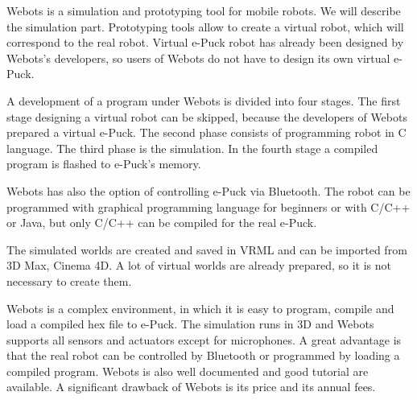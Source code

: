   Webots is a simulation and prototyping tool for mobile robots.
  We will describe the simulation part.  Prototyping tools allow to create a virtual robot,
  which will correspond to the real robot.
  Virtual e-Puck robot has already been designed
  by Webots's developers, so users of Webots do not have to design its own virtual e-Puck.
  
  A development of a program under Webots is divided into four stages. 
  The first stage designing a virtual robot can be skipped,
  because the developers of Webots prepared a virtual e-Puck.
  The second phase consists of programming robot in C language. 
  The third phase is the simulation. 
  In the fourth stage a compiled program is flashed to e-Puck's memory.
  
  Webots has also the option of controlling e-Puck via Bluetooth.
  The robot can be programmed with graphical programming language 
  for beginners or with C/C++ or Java,
  but only C/C++ can be compiled for the real e-Puck.
  
  The simulated worlds are created and saved in VRML and can be imported 
  from 3D Max, Cinema 4D.
  A lot of virtual worlds are already prepared, so it is not necessary to create them.
  
  Webots is a complex environment, in which it is easy to program, compile and load 
  a compiled hex file to e-Puck.
  The simulation runs in 3D and Webots supports all sensors and actuators except for microphones.
  A great advantage is that the real robot can be controlled by Bluetooth or
  programmed by loading a compiled program.
  Webots is also well documented and good tutorial are available.
  A significant drawback of Webots is its price and its annual fees.
  
